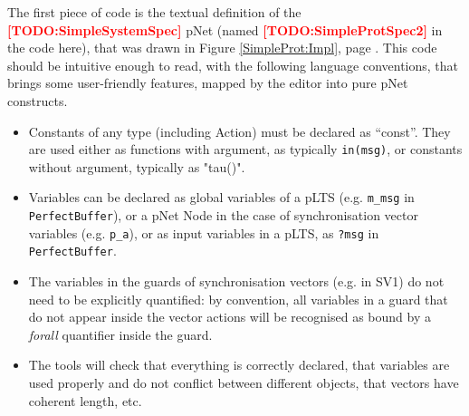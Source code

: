 \documentclass{lmcs}
\newcommand{\TODO}[1]{\textcolor{red}{\textbf{[TODO:#1]}}}
\begin{document}


  

The first piece of code is the textual definition of the \TODO{SimpleSystemSpec}
pNet (named \TODO{SimpleProtSpec2} in the code here), that was drawn in Figure \ref{SimpleProt:Impl}, page \pageref{SimpleProt:Impl}. This code should be intuitive enough to read, with the following
language conventions, that brings some user-friendly features, mapped by the editor into pure pNet constructs.

\begin{itemize}
  \item Constants of any type (including Action) must be declared as
    ``const''. They are used either as functions with argument, as
    typically \texttt{in(msg)}, or constants without argument, typically as "tau()".
  \item Variables can be declared as global variables of a pLTS (e.g. \texttt{m\_msg} in \texttt{PerfectBuffer}), or a pNet Node in the case of synchronisation vector variables (e.g. \texttt{p\_a}),
    or as input variables in a pLTS, as \texttt{?msg} in \texttt{PerfectBuffer}.
  \item The variables in the guards of synchronisation vectors (e.g. in SV1) do not need to be explicitly quantified: by convention, all variables in a guard that do not appear inside the vector actions will be recognised as bound by a \emph{forall} quantifier inside the guard.
    \item The tools will check that everything is correctly declared, that variables are used properly and do not conflict between different objects, that vectors have coherent length, etc.
\end{itemize}
\bigskip
\end{document}
